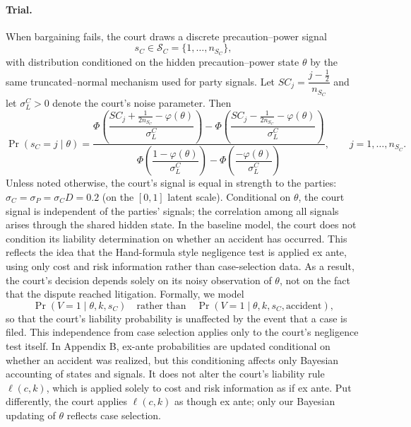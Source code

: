 \documentclass{article}
\begin{document}
\paragraph{Trial.}
When bargaining fails, the court draws a discrete precaution–power signal
\[
s_C \in \mathcal{S}_C=\{1,\dots,n_{S_C}\},
\]
with distribution conditioned on the hidden precaution–power state $\theta$ by the same truncated–normal mechanism used for party signals. Let $SC_j=\dfrac{j-\tfrac12}{n_{S_C}}$ and let $\sigma_L^{C}>0$ denote the court’s noise parameter. Then
\[
\Pr(s_C=j\mid \theta)
=
\frac{
\Phi\!\left(\dfrac{SC_j+\tfrac{1}{2n_{S_C}}-\varphi(\theta)}{\sigma_L^{C}}\right)
-
\Phi\!\left(\dfrac{SC_j-\tfrac{1}{2n_{S_C}}-\varphi(\theta)}{\sigma_L^{C}}\right)
}{
\Phi\!\left(\dfrac{1-\varphi(\theta)}{\sigma_L^{C}}\right)
-
\Phi\!\left(\dfrac{-\varphi(\theta)}{\sigma_L^{C}}\right)
},
\qquad j=1,\dots,n_{S_C}.
\]
Unless noted otherwise, the court's signal is equal in strength to the parties: $\sigma_C = \sigma_P = \sigma_CD= 0.2$ (on the $[0,1]$ latent scale). Conditional on $\theta$, the court signal is independent of the parties’ signals; the correlation among all signals arises through the shared hidden state. In the baseline model, the court does not condition its liability determination on whether an accident has occurred. This reflects the idea that the Hand-formula style negligence test is applied ex ante, using only cost and risk information rather than case-selection data. As a result, the court’s decision depends solely on its noisy observation of $\theta$, not on the fact that the dispute reached litigation. Formally, we model
\[
\Pr(V=1 \mid \theta,k,s_C) \quad \text{rather than} \quad \Pr(V=1 \mid \theta,k,s_C,\text{accident}),
\]
so that the court’s liability probability is unaffected by the event that a case is filed. This independence from case selection applies only to the court’s negligence test itself. In Appendix B, ex-ante probabilities are updated conditional on whether an accident was realized, but this conditioning affects only Bayesian accounting of states and signals. It does not alter the court’s liability rule $\ell(c,k)$, which is applied solely to cost and risk information as if ex ante. Put differently, the court applies $\ell(c,k)$ as though ex ante; only our Bayesian updating of $\theta$ reflects case selection.
\end{document}
